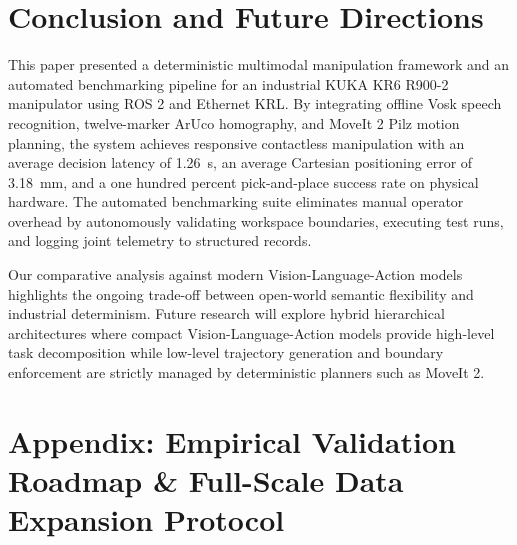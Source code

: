 \documentclass[runningheads]{llncs}
\begin{document}
\section{Conclusion and Future Directions}
\label{sec:conclusion}

This paper presented a deterministic multimodal manipulation framework and an automated benchmarking pipeline for an industrial KUKA KR6 R900-2 manipulator using ROS 2 and Ethernet KRL. By integrating offline Vosk speech recognition, twelve-marker ArUco homography, and MoveIt 2 Pilz motion planning, the system achieves responsive contactless manipulation with an average decision latency of \SI{1.26}{\second}, an average Cartesian positioning error of \SI{3.18}{\milli\meter}, and a one hundred percent pick-and-place success rate on physical hardware. The automated benchmarking suite eliminates manual operator overhead by autonomously validating workspace boundaries, executing test runs, and logging joint telemetry to structured records.

Our comparative analysis against modern Vision-Language-Action models highlights the ongoing trade-off between open-world semantic flexibility and industrial determinism. Future research will explore hybrid hierarchical architectures where compact Vision-Language-Action models provide high-level task decomposition while low-level trajectory generation and boundary enforcement are strictly managed by deterministic planners such as MoveIt 2.




\newpage
\section*{Appendix: Empirical Validation Roadmap \& Full-Scale Data Expansion Protocol}
\end{document}
